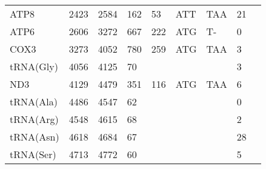 \documentclass[../DISSERTACAO_MAIN.tex]{subfiles}
\begin{document}
\begin{longtable}{llllllllllllllllllllll}
			ATP8         & \multicolumn{2}{l}{2423}    & \multicolumn{2}{l}{2584}    & \multicolumn{2}{l}{162}         & \multicolumn{3}{l}{53}                        & \multicolumn{3}{l}{ATT}   & \multicolumn{3}{l}{TAA}     & \multicolumn{3}{l}{21}          & \multicolumn{3}{l}{}         \\
			ATP6         & \multicolumn{2}{l}{2606}    & \multicolumn{2}{l}{3272}    & \multicolumn{2}{l}{667}         & \multicolumn{3}{l}{222}                       & \multicolumn{3}{l}{ATG}   & \multicolumn{3}{l}{T-}      & \multicolumn{3}{l}{0}           & \multicolumn{3}{l}{}         \\
			COX3         & \multicolumn{2}{l}{3273}    & \multicolumn{2}{l}{4052}    & \multicolumn{2}{l}{780}         & \multicolumn{3}{l}{259}                       & \multicolumn{3}{l}{ATG}   & \multicolumn{3}{l}{TAA}     & \multicolumn{3}{l}{3}           & \multicolumn{3}{l}{}         \\
			tRNA(Gly)    & \multicolumn{2}{l}{4056}    & \multicolumn{2}{l}{4125}    & \multicolumn{2}{l}{70}          & \multicolumn{3}{l}{}                          & \multicolumn{3}{l}{}      & \multicolumn{3}{l}{}        & \multicolumn{3}{l}{3}           & \multicolumn{3}{l}{}         \\
			ND3          & \multicolumn{2}{l}{4129}    & \multicolumn{2}{l}{4479}    & \multicolumn{2}{l}{351}         & \multicolumn{3}{l}{116}                       & \multicolumn{3}{l}{ATG}   & \multicolumn{3}{l}{TAA}     & \multicolumn{3}{l}{6}           & \multicolumn{3}{l}{}         \\
			tRNA(Ala)    & \multicolumn{2}{l}{4486}    & \multicolumn{2}{l}{4547}    & \multicolumn{2}{l}{62}          & \multicolumn{3}{l}{}                          & \multicolumn{3}{l}{}      & \multicolumn{3}{l}{}        & \multicolumn{3}{l}{0}           & \multicolumn{3}{l}{}         \\
			tRNA(Arg)    & \multicolumn{2}{l}{4548}    & \multicolumn{2}{l}{4615}    & \multicolumn{2}{l}{68}          & \multicolumn{3}{l}{}                          & \multicolumn{3}{l}{}      & \multicolumn{3}{l}{}        & \multicolumn{3}{l}{2}           & \multicolumn{3}{l}{}         \\
			tRNA(Asn)    & \multicolumn{2}{l}{4618}    & \multicolumn{2}{l}{4684}    & \multicolumn{2}{l}{67}          & \multicolumn{3}{l}{}                          & \multicolumn{3}{l}{}      & \multicolumn{3}{l}{}        & \multicolumn{3}{l}{28}          & \multicolumn{3}{l}{}         \\
			tRNA(Ser)    & \multicolumn{2}{l}{4713}    & \multicolumn{2}{l}{4772}    & \multicolumn{2}{l}{60}          & \multicolumn{3}{l}{}                          & \multicolumn{3}{l}{}      & \multicolumn{3}{l}{}        & \multicolumn{3}{l}{5}           & \multicolumn{3}{l}{}         \\

\end{longtable}
\end{document}

